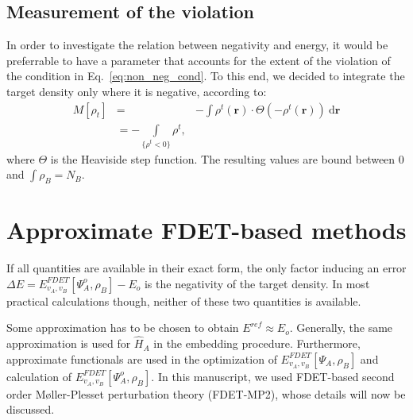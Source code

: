 \documentclass[journal=jctcce,manuscript=article, layout=twocolumn]{achemso}
\begin{document}
\subsection{Measurement of the violation}
In order to investigate the relation between negativity and energy, it would be preferrable to have a parameter that accounts for the extent of the violation of the condition in Eq.~\ref{eq:non_neg_cond}. 
To this end, we decided to integrate the target density only where it is negative, according to:
\begin{align}\label{eq:M}
  M[\rho_{t}] & = & -\int \rho^{t}(\mathbf{r})\cdot \Theta(-\rho^{t}(\mathbf{r})) \ \mathrm{d}\mathbf{r} \\ \nonumber
  & = -\int \limits_{\{\rho^t < 0\}} \rho^{t},
  \end{align}
where $\Theta$ is the Heaviside step function. The resulting values are bound between 0 and $\int \rho_B = N_B$.
\section{Approximate FDET-based methods}\label{sect:FDET_approx}
If all quantities are available in their exact form, the only factor inducing an error $\Delta E = E_{v_A,v_B}^{FDET}[\Psi_{A}^{o},\rho_B] - E_o$ is the negativity of the target density. 
In most practical calculations though, neither of these two quantities is available.

Some approximation has to be chosen to obtain $E^{ref} \approx E_o$. Generally, the same approximation is used for $\hat{H}_A$ in the embedding procedure.
Furthermore, approximate functionals are used in the optimization of $E_{v_A,v_B}^{FDET}[\Psi_{A},\rho_B]$ and calculation of $E_{v_A,v_B}^{FDET}[\Psi_{A}^{o},\rho_B]$.
In this manuscript, we used FDET-based second order M{\o}ller-Plesset perturbation theory (FDET-MP2), whose details will now be discussed.
\end{document}
